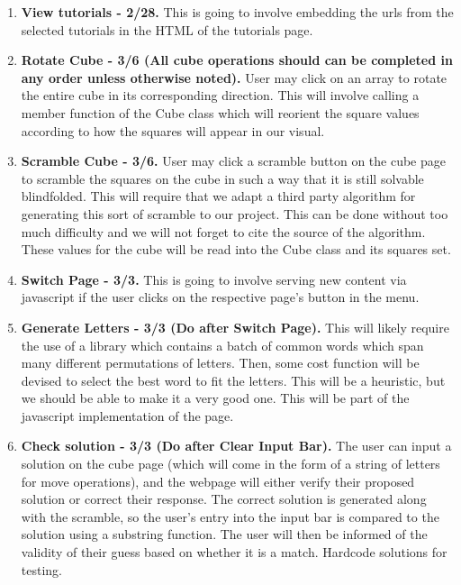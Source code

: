\documentclass[12pt]{article}
\begin{document}
\begin{enumerate}
	\item \textbf{View tutorials - 2/28.} This is going to involve embedding the urls from the selected tutorials in the HTML of the tutorials page.
	\item \textbf{Rotate Cube - 3/6 (All cube operations should can be completed in any order unless otherwise noted).} User may click on an array to rotate the entire cube in its corresponding direction.
This will involve calling a member function of the Cube class which will reorient the square values according to how the squares will appear in our visual.

	\item \textbf{Scramble Cube - 3/6.} User may click a scramble button on the cube page to scramble the squares on the cube in such a way that it is still solvable blindfolded. This will require that we adapt a third party algorithm for generating this sort of scramble to our project. This can be done without too much difficulty and we will not forget to cite the source of the algorithm. These values for the cube will be read into the Cube class and its squares set.

	\item \textbf{Switch Page - 3/3.} This is going to involve serving new content via javascript if the user clicks on the respective page’s button in the menu.
	\item \textbf{Generate Letters - 3/3 (Do after Switch Page).} This will likely require the use of a library which contains a batch of common words which span many different permutations of letters. Then, some cost function will be devised to select the best word to fit the letters. This will be a heuristic, but we should be able to make it a very good one. This will be part of the javascript implementation of the page.
	\item \textbf{Check solution - 3/3 (Do after Clear Input Bar).} The user can input a solution on the cube page (which will come in the form of a string of letters for move operations), and the webpage will either verify their proposed solution or correct their response. The correct solution is generated along with the scramble, so the user’s entry into the input bar is compared to the solution using a substring function. The user will then be informed of the validity of their guess based on whether it is a match. Hardcode solutions for testing.


\end{enumerate}
\end{document}
